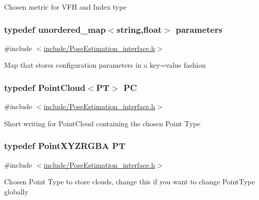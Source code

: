 Chosen metric for V\-F\-H and Index type \hypertarget{group__Typedefs_gacbb28d8f791bb363852e522cf3b83c47}{
\subsubsection[{parameters}]{\setlength{\rightskip}{0pt plus 5cm}typedef unordered\-\_\-map$<$string,float$>$ {\bf parameters}}}\label{group__Typedefs_gacbb28d8f791bb363852e522cf3b83c47}


{\ttfamily \#include $<$\hyperlink{PoseEstimation__interface_8h}{include/\-Pose\-Estimation\-\_\-interface.\-h}$>$}

Map that stores configuration parameters in a key=value fashion \hypertarget{group__Typedefs_ga62eb21fcfa3189c5de50fb62a2a7a79e}{
\subsubsection[{P\-C}]{\setlength{\rightskip}{0pt plus 5cm}typedef Point\-Cloud$<${\bf P\-T}$>$ {\bf P\-C}}}\label{group__Typedefs_ga62eb21fcfa3189c5de50fb62a2a7a79e}


{\ttfamily \#include $<$\hyperlink{PoseEstimation__interface_8h}{include/\-Pose\-Estimation\-\_\-interface.\-h}$>$}

Short writing for Point\-Cloud containing the chosen Point Type \hypertarget{group__Typedefs_ga102df08e7bbccbe3fa6e0b53fd9bac74}{
\subsubsection[{P\-T}]{\setlength{\rightskip}{0pt plus 5cm}typedef Point\-X\-Y\-Z\-R\-G\-B\-A {\bf P\-T}}}\label{group__Typedefs_ga102df08e7bbccbe3fa6e0b53fd9bac74}


{\ttfamily \#include $<$\hyperlink{PoseEstimation__interface_8h}{include/\-Pose\-Estimation\-\_\-interface.\-h}$>$}

Chosen Point Type to store clouds, change this if you want to change Point\-Type globally 